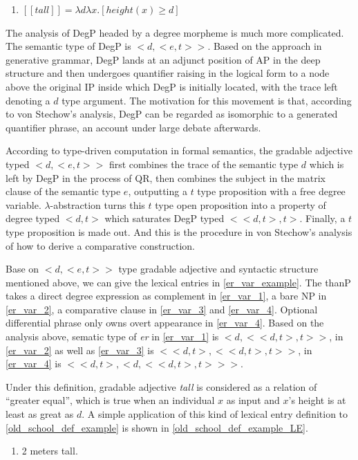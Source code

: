 \documentclass{ctexart}
\begin{document}
\begin{enumerate}
    \item \label{von_stechow_LE} $[\![tall]\!] = \lambda d \lambda x. [height(x) \geq d]$
\end{enumerate}

The analysis of DegP headed by a degree morpheme is much more complicated. The semantic type of DegP is $<d,<e,t>>$. Based on the approach in generative grammar, DegP lands at an adjunct position of AP in the deep structure and then undergoes quantifier raising in the logical form to a node above the original IP inside which DegP is initially located, with the trace left denoting a $d$ type argument. The motivation for this movement is that, according to von Stechow's analysis, DegP can be regarded as isomorphic to a generated quantifier phrase, an account under large debate afterwards.

According to type-driven computation in formal semantics, the gradable adjective typed $<d,<e,t>>$ first combines the trace of the semantic type $d$ which is left by DegP in the process of QR, then combines the subject in the matrix clause of the semantic type $e$, outputting a $t$ type proposition with a free degree variable. $\lambda$-abstraction turns this $t$ type open proposition into a property of degree typed $<d,t>$ which saturates DegP typed $<<d,t>,t>$. Finally, a $t$ type proposition is made out. And this is the procedure in von Stechow's analysis of how to derive a comparative construction.

Base on $<d,<e,t>>$ type gradable adjective and syntactic structure mentioned above, we can give the lexical entries in \ref{er_var_example}. The thanP takes a direct degree expression as complement in \ref{er_var_1}, a bare NP in \ref{er_var_2}, a comparative clause in \ref{er_var_3} and \ref{er_var_4}. Optional differential phrase only owns overt appearance in \ref{er_var_4}. Based on the analysis above, sematic type of \textit{er} in \ref{er_var_1} is $<d,<<d,t>,t>>$, in \ref{er_var_2} as well as \ref{er_var_3} is $<<d,t>,<<d,t>,t>>$, in \ref{er_var_4} is $<<d,t>,<d,<<d,t>,t>>>$.

Under this definition, gradable adjective \textit{tall} is considered as a relation of ``greater equal'', which is true when an individual $x$ as input and $x$'s height is at least as great as $d$. A simple application of this kind of lexical entry definition to \ref{old_school_def_example} is shown in \ref{old_school_def_example_LE}.

\begin{enumerate}
    \item \label{old_school_def_example} 2 meters tall.
\end{enumerate}
\end{document}
